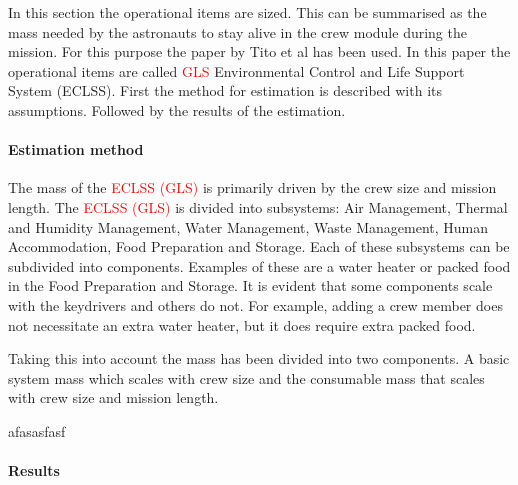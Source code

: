 In this section the operational items are sized. This can be summarised as the mass needed by the astronauts to stay alive in the crew module during the mission. For this purpose the paper by Tito et al \cite{tito2013} has been used. In this paper the operational items are called \textcolor{red}{GLS} Environmental Control and Life Support System (ECLSS). First the method for estimation is described with its assumptions. Followed by the results of the estimation.

\paragraph{Estimation method}
\label{par:operationalest}
The mass of the \textcolor{red}{ECLSS (GLS)} is primarily driven by the crew size and mission length. The \textcolor{red}{ECLSS (GLS)} is divided into subsystems: Air Management, Thermal and Humidity Management, Water Management, Waste Management, Human Accommodation, Food Preparation and Storage. Each of these subsystems can be subdivided into components. Examples of these are a water heater or packed food in the Food Preparation and Storage. It is evident that some components scale with the keydrivers and others do not. For example, adding a crew member does not necessitate an extra water heater, but it does require extra packed food. 


Taking this into account the mass has been divided into two components. A basic system mass which scales with crew size and the consumable mass that scales with crew size and mission length.





afasasfasf
\paragraph{Results}



